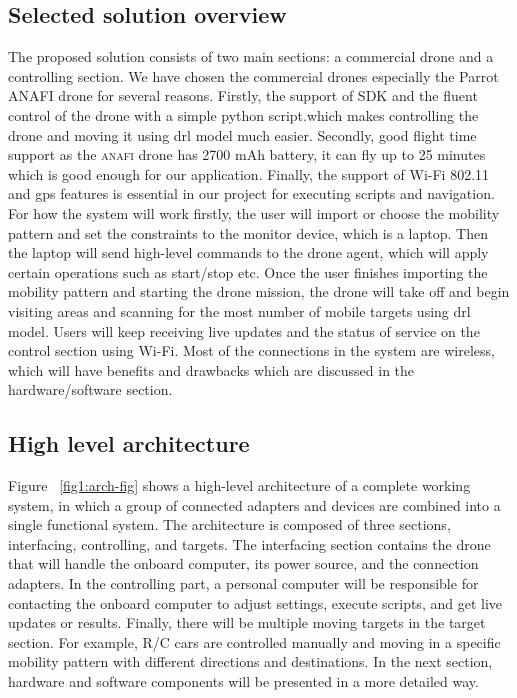 \documentclass[../main.tex]{subfiles}
\begin{document}
\subsection{Selected solution overview}
The proposed solution consists of two main sections: a commercial drone and a controlling section.
We have chosen the commercial drones especially the Parrot ANAFI drone for several reasons.
Firstly, the support of SDK and the fluent control of the drone with a simple python script.which makes controlling the drone and moving it using \gls{drl} model much easier. 
Secondly, good flight time support as the \textsc{anafi} drone has 2700 mAh battery, it can fly up to 25 minutes which is good enough for our application.
Finally, the support of Wi-Fi 802.11 and \gls{gps} features is essential in our project for executing scripts and navigation. 
For how the system will work firstly, the user will import or choose the mobility pattern and set the constraints to the monitor device, which is a laptop.
Then the laptop will send high-level commands to the drone agent, which will apply certain operations such as start/stop etc.
Once the user finishes importing the mobility pattern and starting the drone mission, the drone will take off and begin visiting areas and scanning for the most number of mobile targets using \gls{drl} model.
Users will keep receiving live updates and the status of service on the control section using Wi-Fi.
Most of the connections in the system are wireless, which will have benefits and drawbacks  which are discussed in the hardware/software section.

\newpage
\subsection{High level architecture}
Figure ~\ref{fig1:arch-fig} shows a high-level architecture of a complete working system, in which a group of connected adapters and devices are combined into a single functional system. The architecture is composed of three sections, interfacing, controlling, and targets. The interfacing section contains the drone that will handle the onboard computer, its power source, and the connection adapters. In the controlling part, a personal computer will be responsible for contacting the onboard computer to adjust settings, execute scripts, and get live updates or results. Finally, there will be multiple moving targets in the target section. For example, R/C cars are controlled manually and moving in a specific mobility pattern with different directions and destinations. In the next section, hardware and software components will be presented in a more detailed way.
\end{document}
